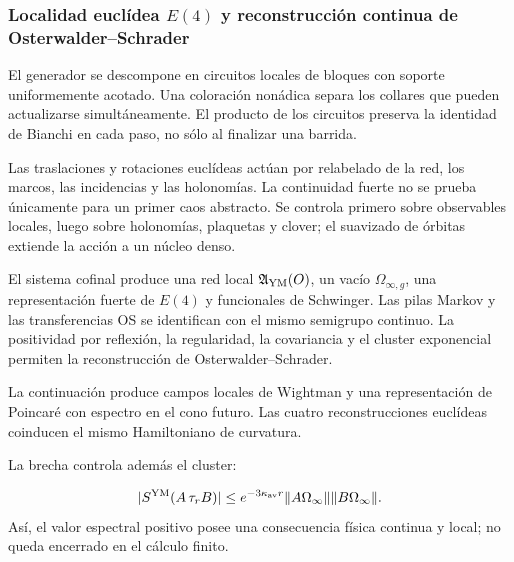 \subsubsection{Localidad euclídea \(E(4)\) y reconstrucción continua de Osterwalder–Schrader}
El generador se descompone en circuitos locales de bloques con soporte uniformemente acotado. Una coloración nonádica separa los collares que pueden actualizarse simultáneamente. El producto de los circuitos preserva la identidad de Bianchi en cada paso, no sólo al finalizar una barrida.\par
Las traslaciones y rotaciones euclídeas actúan por relabelado de la red, los marcos, las incidencias y las holonomías. La continuidad fuerte no se prueba únicamente para un primer caos abstracto. Se controla primero sobre observables locales, luego sobre holonomías, plaquetas y clover; el suavizado de órbitas extiende la acción a un núcleo denso.\par
El sistema cofinal produce una red local \(\mathfrak A_{\rm YM}(O)\), un vacío \(\Omega_{\infty,g}\), una representación fuerte de \(E(4)\) y funcionales de Schwinger. Las pilas Markov y las transferencias OS se identifican con el mismo semigrupo continuo. La positividad por reflexión, la regularidad, la covariancia y el cluster exponencial permiten la reconstrucción de Osterwalder–Schrader.\par
La continuación produce campos locales de Wightman y una representación de Poincaré con espectro en el cono futuro. Las cuatro reconstrucciones euclídeas coinducen el mismo Hamiltoniano de curvatura.\par
La brecha controla además el cluster:\par
\[
|S^{\rm YM}(A\,\tau_rB)|
\le
e^{-3\kappa_{\rm av}r}
\|A\Omega_\infty\|
\|B\Omega_\infty\|.
\]
Así, el valor espectral positivo posee una consecuencia física continua y local; no queda encerrado en el cálculo finito.\par
{}
